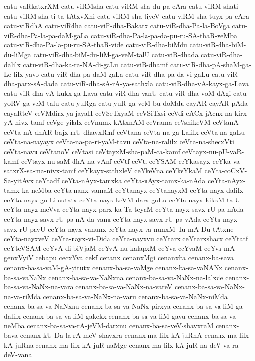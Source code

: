 {catu-vaRkatxrXM
catu-viRMsha
catu-viRM-sha-du-pa-cAra
catu-viRM-shati
catu-viRM-sha-ti-ta-tAtxvXni
catu-viRM-sha-tiyeV
catu-viRM-sha-tuyx-pa-cAra
catu-viRdhA
catu-viRdha
catu-viR-dha-Bakatx
catu-viR-dha-Pa-la-BoVga
catu-viR-dha-Pa-la-pa-daM-gaLa
catu-viR-dha-Pa-la-pa-da-pu-ru-SA-thaR-veMba
catu-viR-dha-Pa-la-pu-ru-SA-thaR-vide
catu-viR-dha-biMdu
catu-viR-dha-biM-du-liMga
catu-viR-dha-biM-du-liM-ga-veM-talU
catu-viR-dhada
catu-viR-dha-dalilx
catu-viR-dha-ka-ra-NA-di-gaLu
catu-viR-dhamf
catu-viR-dha-pA-shaM-ga-Le-lilx-yavo
catu-viR-dha-pa-daM-gaLa
catu-viR-dha-pa-da-vi-gaLu
catu-viR-dha-parx-sA-dada
catu-viR-dha-sA-rA-ya-sathxla
catu-viR-dha-vA-kayx-ga-Lava
catu-viR-dha-vA-kukx-ga-Lava
catu-viR-dha-vanU
catu-viR-dha-voM-dAgi
catu-yoRV-ga-veM-talu
catu-yuRga
catu-yuR-ga-veM-bu-doMdu
cayAR
cayAR-pAda
cayaRteV
ceVMdirx-ya-jayaH
ceVSeTxyaM
ceVSiTxsi
ceVdi-cACx-jAcnx-na-kirx-yA-nivx-tamf
ceVge-yilalx
ceVnumx-kAtxnAM
ceVrama
ceVshikeVM
ceVtanA
ceVta-nA-dhAR-bajx-mU-dhavxRmf
ceVtana
ceVta-na-ga-Lalilx
ceVta-na-gaLu
ceVta-na-nayayx
ceVta-na-pa-ri-yaM-tavu
ceVta-na-ralilx
ceVta-na-shecxVti
ceVta-navu
ceVtanoV
ceVtasi
ceVtayxM-sha-paM-ca-kamf
ceVtayx-nu-pU-vaR-kamf
ceVtayx-nu-saM-dhA-na-vAnf
ceVtf
ceVti
ceYSAM
ceYkasayx
ceYka-va-satxrX-sa-ma-nivx-tamf
ceYkayx-sathxleV
ceYkeVna
ceYkeYkaM
ceYta-coCxV-Sa-yitAvx
ceYtadf
ceYta-nAyx-tamxka
ceYta-nAyx-tamx-ka-nAda
ceYta-nAyx-tamx-ka-neMba
ceYta-nanx-vamaM
ceYtanayx
ceYtanayxM
ceYta-nayx-dalilx
ceYta-nayx-go-Li-sutatx
ceYta-nayx-keVM-darx-gaLu
ceYta-nayx-kikxM-talU
ceYta-nayx-meVva
ceYta-nayx-parx-ka-Ta-teyaM
ceYta-nayx-savx-rU-pa-nAda
ceYta-nayx-savx-rU-pa-nA-da-vanu
ceYta-nayx-savx-rU-pa-vAda
ceYta-nayx-savx-rU-pavU
ceYta-nayx-vanunx
ceYta-nayx-va-nunxM-Tu-mA-Du-tAtxne
ceYta-nayxveV
ceYta-nayx-vi-Dida
ceYta-nayxvu
ceYtarx
ceYtarxshacx
ceYtatf
ceYteVSAM
ceYvA-di-biVjaM
ceYvA-nu-kalapxM
ceYva
ceYvaM
ceYva-mA-genxVyiV
cebapu
cecxYva
cekf
cenanx
cenanxMgi
cenanxba
cenanx-ba-sava
cenanx-ba-sa-vaM-gA-yitutx
cenanx-ba-sa-vaMge
cenanx-ba-sa-vaNANx
cenanx-ba-sa-vaNaNx
cenanx-ba-sa-va-NaNxna
cenanx-ba-sa-va-NaNx-na-lalxde
cenanx-ba-sa-va-NaNx-na-vara
cenanx-ba-sa-va-NaNx-na-vareV
cenanx-ba-sa-va-NaNx-na-va-riMda
cenanx-ba-sa-va-NaNx-na-varu
cenanx-ba-sa-va-NaNx-niMda
cenanx-ba-sa-va-NaNxnu
cenanx-ba-sa-va-NaNx-pirxya
cenanx-ba-sa-va-liM-ga-dalilx
cenanx-ba-sa-va-liM-gakekx
cenanx-ba-sa-va-liM-gavu
cenanx-ba-sa-va-neMba
cenanx-ba-sa-va-rA-jeVM-darxnu
cenanx-ba-sa-veV-shavxraM
cenanx-bava
cenanx-kU-Da-la-rA-meV-shavxra
cenanx-ma-lilx-kA-juRnA
cenanx-ma-lilx-kA-juRna
cenanx-ma-lilx-kA-juR-naMge
cenanx-ma-lilx-kA-juR-na-deV-va-ra-deV-vana
}

